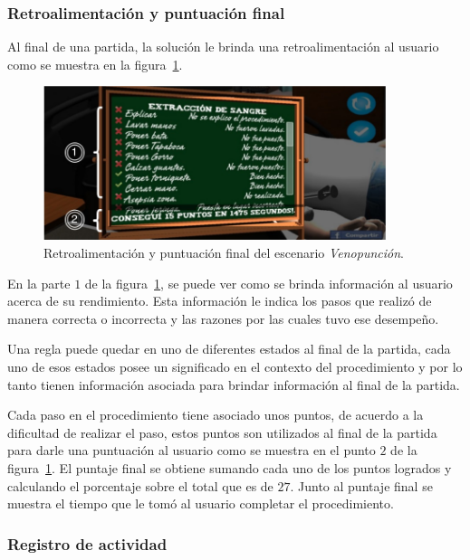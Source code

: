 \subsubsection{Retroalimentación y puntuación final}
\label{sec:puntuacion_hemocultivo}

Al final de una partida, la solución le brinda una retroalimentación al 
usuario como se muestra en la figura~\ref{fig:hemocultivo_retroalimentacion}.

\begin{figure}[H]
\centering 
\includegraphics[width=10cm]{solucion/images/hemocultivo_retroalimentacion.jpg}
\caption{Retroalimentación y puntuación final del escenario \emph{Venopunción}.}
\label{fig:hemocultivo_retroalimentacion}
\end{figure}

En la parte $1$ de la figura~\ref{fig:hemocultivo_retroalimentacion}, se puede
ver como se brinda información al  usuario acerca de su rendimiento. Esta
información le indica los pasos que realizó de manera correcta o incorrecta y
las razones por las cuales tuvo ese desempeño.

Una regla puede quedar en uno de diferentes estados al final de la partida, cada
uno de esos estados posee un significado en el contexto del procedimiento y por
lo tanto tienen información asociada para brindar información al final de la
partida.

Cada paso en el procedimiento tiene asociado unos puntos, de acuerdo a la dificultad de realizar el
paso, estos puntos son utilizados al final de la partida para darle una puntuación al
usuario como se muestra en el punto $2$ de la
figura~\ref{fig:hemocultivo_retroalimentacion}. El puntaje final se obtiene sumando cada 
uno de los puntos logrados y calculando el porcentaje sobre el total que es de $27$. Junto al 
puntaje final se muestra el tiempo que le tomó al usuario completar el procedimiento.


\subsubsection{Registro de actividad}

